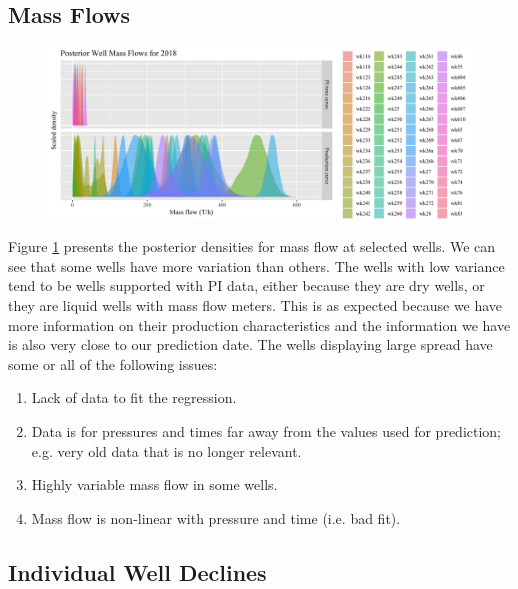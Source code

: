 \documentclass[a4paper, 12pt]{article}
\begin{document}
\subsection{Mass Flows}
\begin{figure}
\centering
  \includegraphics[width=\linewidth]{media/mf_wells}
  \label{fig:mf_wells}
\end{figure}

Figure \ref{fig:mf_wells} presents the posterior densities for mass flow at selected wells. We can see that some wells have more variation than others. The wells with low variance tend to be wells supported with PI data, either because they are dry wells, or they are liquid wells with mass flow meters. This is as expected because we have more information on their production characteristics and the information we have is also very close to our prediction date. The wells displaying large spread have some or all of the following issues:

\begin{enumerate}
\item Lack of data to fit the regression.
\item Data is for pressures and times far away from the values used for prediction; e.g. very old data that is no longer relevant.
\item Highly variable mass flow in some wells.
\item Mass flow is non-linear with pressure and time (i.e. bad fit).

\end{enumerate}

\subsection{Individual Well Declines}
\end{document}
